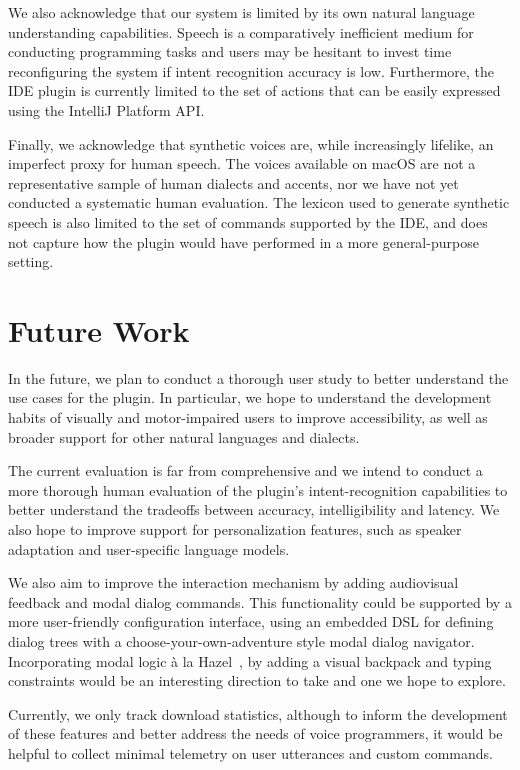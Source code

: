 \documentclass[conference]{IEEEtran}
\begin{document}
We also acknowledge that our system is limited by its own natural language understanding capabilities. Speech is a comparatively inefficient medium for conducting programming tasks and users may be hesitant to invest time reconfiguring the system if intent recognition accuracy is low. Furthermore, the IDE plugin is currently limited to the set of actions that can be easily expressed using the IntelliJ Platform API.

Finally, we acknowledge that synthetic voices are, while increasingly lifelike, an imperfect proxy for human speech. The voices available on macOS are not a representative sample of human dialects and accents, nor we have not yet conducted a systematic human evaluation. The lexicon used to generate synthetic speech is also limited to the set of commands supported by the IDE, and does not capture how the plugin would have performed in a more general-purpose setting.

\section{Future Work}

In the future, we plan to conduct a thorough user study to better understand the use cases for the plugin. In particular, we hope to understand the development habits of visually and motor-impaired users to improve accessibility, as well as broader support for other natural languages and dialects.

The current evaluation is far from comprehensive and we intend to conduct a more thorough human evaluation of the plugin's intent-recognition capabilities to better understand the tradeoffs between accuracy, intelligibility and latency. We also hope to improve support for personalization features, such as speaker adaptation and user-specific language models.

We also aim to improve the interaction mechanism by adding audiovisual feedback and modal dialog commands. This functionality could be supported by a more user-friendly configuration interface, using an embedded DSL for defining dialog trees with a choose-your-own-adventure style modal dialog navigator. Incorporating modal logic \`a la Hazel~\cite{omar2021filling}, by adding a visual backpack and typing constraints would be an interesting direction to take and one we hope to explore.

Currently, we only track download statistics, although to inform the development of these features and better address the needs of voice programmers, it would be helpful to collect minimal telemetry on user utterances and custom commands.
\end{document}
